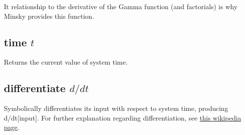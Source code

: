 It relationship to the derivative of the Gamma function (and
factorials) is why Minsky provides this function.

\subsection{time $t$}\label{Operation:time} Returns the current value
of system time.

\subsection{differentiate $d/dt$}\label{Operation:differentiate}
Symbolically differentiates its input with respect to system time,
producing d/dt[input].  For further explanation regarding
differentiation, see
\href{https://en.wikipedia.org/wiki/Derivative}{this wikipedia page}.

